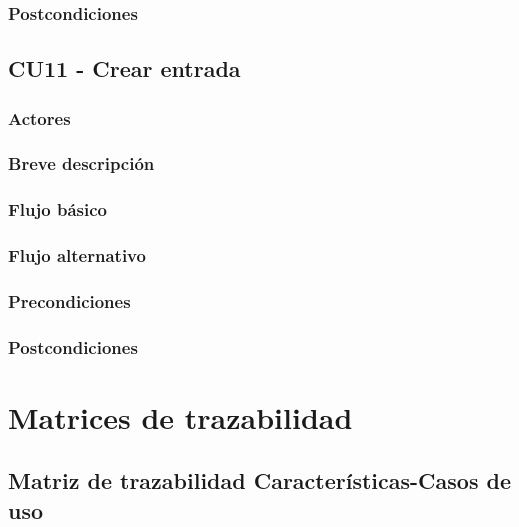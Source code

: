\documentclass[12pt, a4paper, titlepage]{article}
\begin{document}
\subsubsection{Postcondiciones}


\subsection{CU11 - Crear entrada}
\subsubsection{Actores}
\subsubsection{Breve descripción}
\subsubsection{Flujo básico}
\subsubsection{Flujo alternativo}
\subsubsection{Precondiciones}
\subsubsection{Postcondiciones}



\section{Matrices de trazabilidad}  
\subsection{\large Matriz de trazabilidad Características-Casos de uso}

  
\end{document}
